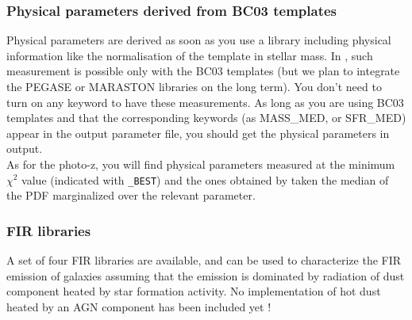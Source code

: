 \documentclass[12pt]{article}
\begin{document}
\subsubsection{Physical parameters derived from BC03 templates}


Physical parameters are derived as soon as you use a library including physical information like the normalisation of the template in stellar mass. In \lp, such measurement is possible only with the BC03 templates (but we plan to integrate the PEGASE or MARASTON libraries on the long term). You don't need to turn on any keyword to have these measurements. As long as you are using BC03 templates and that the corresponding keywords (as MASS\_MED, or SFR\_MED) appear in the output parameter file, you should get the physical parameters in output.\\

As for the photo-z, you will find physical parameters measured at the minimum $\chi^2$ value (indicated with \texttt{\_BEST}) and the ones obtained by taken the median of the PDF marginalized over the relevant parameter.\\


\subsubsection{ FIR libraries}

A set of four FIR libraries are available, and can be used to characterize the FIR emission
of galaxies assuming that the  emission is dominated by radiation of dust component
heated by star formation activity. No implementation of hot dust heated by an AGN 
component has been included yet !   \\
\end{document}
